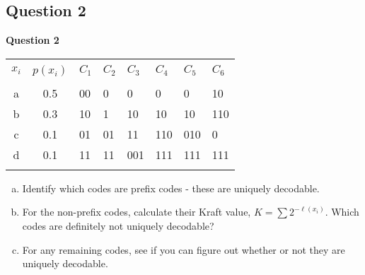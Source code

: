 \documentclass[compress]{beamer}        %
\makeatletter
\newcommand{\tcb}{\textcolor{beamer@blendedblue}}
\makeatother
\begin{document}
\subsection{Question 2}
\begin{frame}{\bf \tcb{Question 2}}

\begin{center}
\begin{tabular}{|cc|l|l|l|l|l|l|}
\hline
&&&&&&&\\[-0.4cm]
$x_i$ & $p(x_i)$ & $C_1$ & $C_2$ & $C_3$ & $C_4$ & $C_5$ & $C_6$ \\[0.1cm]
\hline
&&&&&&&\\[-0.4cm]
a     & 0.5    &  00  &  0   &  0    &  0   &  0    &  10  \\[0.1cm]
b     & 0.3    &  10  &  1   &  10   &  10  &  10   &  110 \\[0.1cm]
c     & 0.1    &  01  &  01  &  11   &  110 &  010  &  0   \\[0.1cm]
d     & 0.1    &  11  &  11  &  001  &  111 &  111  &  111 \\[0.1cm]
\hline
\multicolumn{8}{c}{}\\[-0.3cm]
\end{tabular}
\end{center}

\begin{enumerate}[a)]\itemsep0.4cm
\item Identify which codes are prefix codes - these are uniquely decodable.
\item For the non-prefix codes, calculate their Kraft value, $K=\sum 2^{-\ell(x_i)}$. Which codes are definitely not uniquely decodable?
\item For any remaining codes, see if you can figure out whether or not they are uniquely decodable.
\end{enumerate}

\end{frame}
\end{document}
